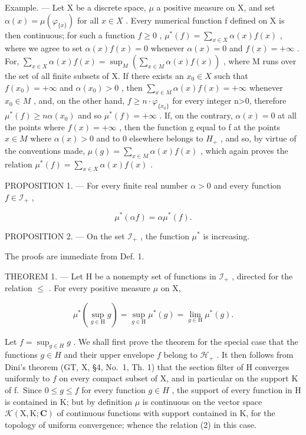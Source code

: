 Example. --- Let X be a discrete space, \(\mu\) a positive measure on X, and set \(\alpha(x)=\mu(\varphi_{\{x\}})\) for all \(x\in X\) . Every numerical function f defined on X is then continuous; for such a function \(f\geqslant0\) , \(\mu^{*}(f)=\sum_{x\in X}\alpha(x)f(x)\) , where we agree to set \(\alpha(x)f(x)=0\) whenever \(\alpha(x)=0\) and \(f(x)=+\infty\) . For, \(\sum_{x\in X}\alpha(x)f(x)=\sup_{M}\left(\sum_{x\in M}\alpha(x)f(x)\right)\) , where M runs over the set of all finite subsets of X. If there exists an \(x_{0}\in X\) such that \(f(x_{0})=+\infty\) and \(\alpha(x_{0})>0\) , then \(\sum_{x\in M}\alpha(x)f(x)=+\infty\) whenever \(x_{0}\in M\) , and, on the other hand, \(f\geqslant n\cdot\varphi_{\{x_{0}\}}\) for every integer n\textgreater0, therefore \(\mu^{*}(f)\geqslant n\alpha(x_{0})\) and so \(\mu^{*}(f)=+\infty\) . If, on the contrary, \(\alpha(x)=0\) at all the points where \(f(x)=+\infty\) , then the function g equal to f at the points \(x\in M\) where \(\alpha(x)>0\) and to 0 elsewhere belongs to \(H_{+}\) , and so, by virtue of the conventions made, \(\mu(g)=\sum_{x\in M}\alpha(x)f(x)\) , which again proves the relation \(\mu^{*}(f)=\sum_{x\in X}\alpha(x)f(x)\) .

PROPOSITION 1. --- For every finite real number \(\alpha > 0\) and every function \(f \in \mathcal{I}_{+}\) ,

\[
\mu^ {*} (\alpha f) = \alpha \mu^ {*} (f).\tag{1}
\]

PROPOSITION 2. --- On the set \(\mathcal{I}_{+}\) , the function \(\mu^{*}\) is increasing.

The proofs are immediate from Def. 1.

THEOREM 1. --- Let H be a nonempty set of functions in \(\mathcal{I}_{+}\) , directed for the relation \(\leqslant\) . For every positive measure \(\mu\) on X,

\[
\mu^ {*} \left(\sup _ {g \in \mathrm{H}} g\right) = \sup _ {g \in \mathrm{H}} \mu^ {*} (g) = \lim _ {g \in \mathrm{H}} \mu^ {*} (g).\tag{2}
\]

Let \(f = \sup_{g \in H} g\) . We shall first prove the theorem for the special case that the functions \(g \in H\) and their upper envelope \(f\) belong to \(\mathcal{H}_+\) . It then follows from Dini's theorem (GT, X, §4, No.~1, Th. 1) that the section filter of H converges uniformly to \(f\) on every compact subset of X, and in particular on the support K of f.~Since \(0 \leqslant g \leqslant f\) for every function \(g \in H\) , the support of every function in H is contained in K; but by definition \(\mu\) is continuous on the vector space \(\mathcal{K}(\mathrm{X},\mathrm{K};\mathbf{C})\) of continuous functions with support contained in K, for the topology of uniform convergence; whence the relation (2) in this case.

